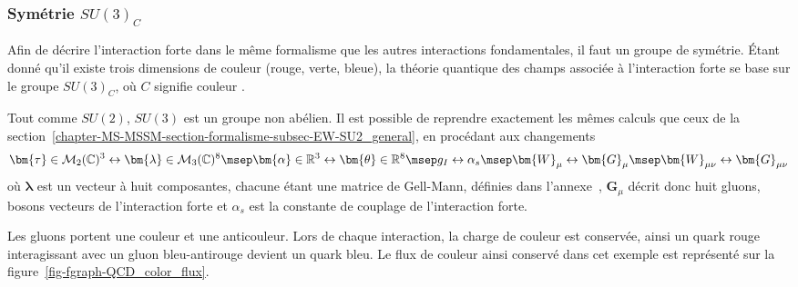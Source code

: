\subsubsection{Symétrie $SU(3)_C$}\label{chapter-MS-MSSM-section-formalisme-subsec-QCD-subsubsec-SU3C}
Afin de décrire l'interaction forte dans le même formalisme que les autres interactions fondamentales, il faut un groupe de symétrie. Étant donné qu'il existe trois dimensions de couleur (rouge, verte, bleue), la théorie quantique des champs associée à l'interaction forte se base sur le groupe $SU(3)_C$, où $C$ signifie \og couleur \fg.
\par Tout comme $SU(2)$, $SU(3)$ est un groupe non abélien. Il est possible de reprendre exactement les mêmes calculs que ceux de la section~\ref{chapter-MS-MSSM-section-formalisme-subsec-EW-SU2_general}, en procédant aux changements
\begin{equation}
\bm{\tau} \in \mathcal{M}_2(\mathbb{C})^3 \leftrightarrow \bm{\lambda} \in \mathcal{M}_3(\mathbb{C})^8
\msep
\bm{\alpha}\in\mathbb{R}^3 \leftrightarrow \bm{\theta}\in\mathbb{R}^8
\msep
g_I \leftrightarrow \alpha_s
\msep
\bm{W}_\mu \leftrightarrow \bm{G}_\mu
\msep
\bm{W}_{\mu\nu} \leftrightarrow \bm{G}_{\mu\nu}
\label{eq-chapter-MS-MSSM-section-formalisme-subsec-QCD-subsubsec-SU3C-analogieSU2}
\end{equation}
où $\bm{\lambda}$ est un vecteur à huit composantes, chacune étant une matrice de Gell-Mann, définies dans l'annexe~, $\bm{G}_\mu$ décrit donc huit gluons, bosons vecteurs de l'interaction forte et $\alpha_s$ est la constante de couplage de l'interaction forte.
\par Les gluons portent une couleur et une anticouleur. Lors de chaque interaction, la charge de couleur est conservée, ainsi un quark rouge interagissant avec un gluon bleu-antirouge devient un quark bleu. Le flux de couleur ainsi conservé dans cet exemple est représenté sur la figure~\ref{fig-fgraph-QCD_color_flux}.
